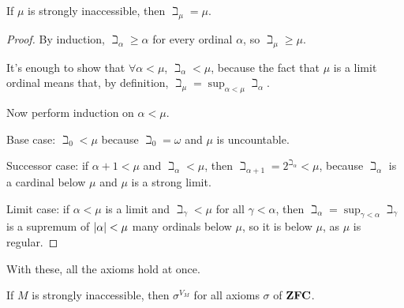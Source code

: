 \begin{boxproposition} \label{Ch3:Prop:Inaccessible_Beth}
    If $\mu$ is strongly inaccessible, then $\beth_{\mu} = \mu$.
\end{boxproposition}
\begin{proof}
    By induction, $\beth_{\alpha} \geq \alpha$ for every ordinal $\alpha$, so $\beth_{\mu} \geq \mu$.

    It's enough to show that $\forall \alpha < \mu$, $\beth_{\alpha} < \mu$, because the fact that $\mu$ is a limit ordinal means that, by definition, $\beth_{\mu} = \sup_{\alpha < \mu} \beth_{\alpha}$.

    Now perform induction on $\alpha < \mu$.
    
    Base case: $\beth_0 < \mu$ because $\beth_0 = \omega$ and $\mu$ is uncountable.

    Successor case: if $\alpha + 1 < \mu$ and $\beth_{\alpha} < \mu$, then $\beth_{\alpha + 1} = 2^{\beth_{\alpha}} < \mu$, because $\beth_{\alpha}$ is a cardinal below $\mu$ and $\mu$ is a strong limit.

    Limit case: if $\alpha < \mu$ is a limit and $\beth_{\gamma} < \mu$ for all $\gamma < \alpha$, then $\beth_{\alpha} = \sup_{\gamma < \alpha} \beth_{\gamma}$ is a supremum of $\left\lvert \alpha \right\rvert < \mu$ many ordinals below $\mu$, so it is below $\mu$, as $\mu$ is regular.
\end{proof}

With these, all the axioms hold at once.

\begin{boxcorollary}
    If $M$ is strongly inaccessible, then $\sigma^{V_M}$ for all axioms $\sigma$ of $\mathbf{ZFC}$.
\end{boxcorollary}
